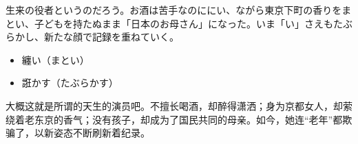 \documentclass{ctexart}
\newcommand{\bbigbreak}{\bigbreak \bigbreak}
\begin{document}
\bbigbreak

\mincho
生来の役者というのだろう。お酒は苦手なのににい、ながら東京下町の香りをまとい、子どもを持たぬまま「日本のお母さん」になった。いま「い」さえもたぶらかし、新たな顔で記録を重ねていく。

\begin{itemize}
    \mincho
    \item 纏い（まとい）
    \item 誑かす（たぶらかす）
\end{itemize}

\rmfamily
大概这就是所谓的天生的演员吧。不擅长喝酒，却醉得潇洒；身为京都女人，却萦绕着老东京的香气；没有孩子，却成为了国民共同的母亲。如今，她连“老年”都欺骗了，以新姿态不断刷新着纪录。

\bbigbreak


\end{document}
